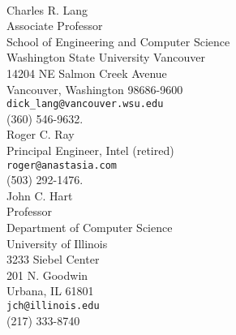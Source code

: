 \documentclass[10pt]{article}
\begin{document}
\vspace{0.25cm}

\\

Charles R. Lang\\ 
Associate Professor \\
School of Engineering and Computer Science \\
Washington State University Vancouver \\
14204 NE Salmon Creek Avenue \\
Vancouver, Washington 98686-9600 \\
\verb$dick_lang@vancouver.wsu.edu$ \\
(360) 546-9632.\\

Roger C. Ray\\
Principal Engineer, Intel (retired)\\
{\tt roger@anastasia.com} \\
(503) 292-1476.\\
 
John C. Hart\\
Professor\\
Department of Computer Science\\
University of Illinois\\
3233 Siebel Center \\
201 N. Goodwin \\
Urbana, IL 61801 \\
{\tt jch@illinois.edu} \\
(217) 333-8740 \\


\end{document}
